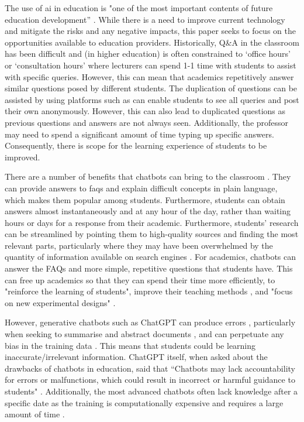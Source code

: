 The use of \acrfull{ai} in education is "one of the most important contents of future education development” \citep{BrowMcCoReev2020eu}. While there is a need to improve current technology and mitigate the risks and any negative impacts, this paper seeks to focus on the opportunities available to education providers. Historically, Q\&A in the classroom has been difficult and (in higher education) is often constrained to `office hours' or `consultation hours' where lecturers can spend 1-1 time with students to assist with specific queries. However, this can mean that academics repetitively answer similar questions posed by different students. The duplication of questions can be assisted by using platforms such as \citet{Piazza} can enable students to see all queries and post their own anonymously. However, this can also lead to duplicated questions as previous questions and answers are not always seen. Additionally, the professor may need to spend a significant amount of time typing up specific answers. Consequently, there is scope for the learning experience of students to be improved.

There are a number of benefits that chatbots can bring to the classroom \citep{Stanislav}. They can provide answers to \acrshort{faq}s and explain difficult concepts in plain language, which makes them popular among students. Furthermore, students can obtain answers almost instantaneously and at any hour of the day, rather than waiting hours or days for a response from their academic. Furthermore, students' research can be streamlined by pointing them to high-quality sources and finding the most relevant parts, particularly where they may have been overwhelmed by the quantity of information available on search engines \citep{Chen22}. For academics, chatbots can answer the FAQs and more simple, repetitive questions that students have. This can free up academics so that they can spend their time more efficiently, to "reinforce the learning of students", improve their teaching methods \citep{Prez2020}, and "focus on new experimental designs" \citep{Eva}.

However, generative chatbots such as ChatGPT can produce errors \citep{marcus2018, Bender21, Eva}, particularly when seeking to summarise and abstract documents \citep{Durmus_2020}, and can perpetuate any bias in the training data \citep{geva2019, brown2020}. This means that students could be learning inaccurate/irrelevant information. ChatGPT itself, when asked about the drawbacks of chatbots in education, said that ``Chatbots may lack accountability for errors or malfunctions, which could result in incorrect or harmful guidance to students" \citep{chatgpt23}. Additionally, the most advanced chatbots often lack knowledge after a specific date as the training is computationally expensive and requires a large amount of time \citep{Jungherr}.

